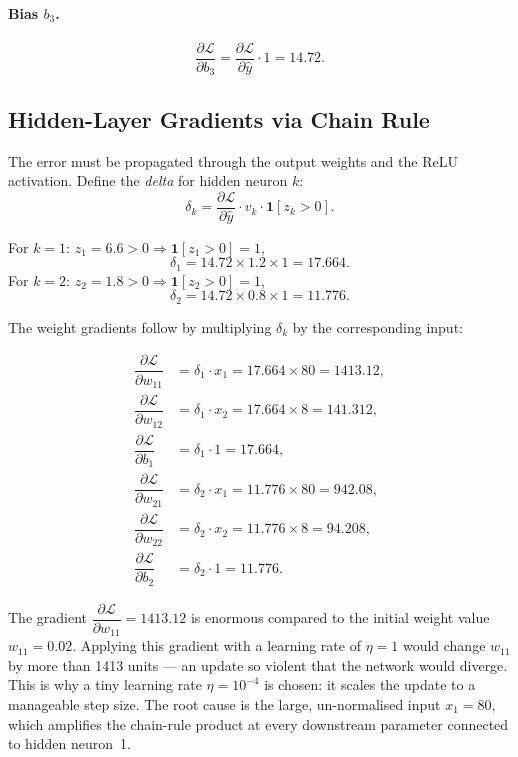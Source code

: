 \documentclass[12pt,a4paper]{article}
\newcommand{\Loss}{\mathcal{L}}
\newcommand{\yhat}{\hat{y}}
\newcommand{\pderiv}[2]{\dfrac{\partial #1}{\partial #2}}
\begin{document}
\paragraph{Bias $b_3$.}
\begin{equation}
  \pderiv{\Loss}{b_3}
    = \pderiv{\Loss}{\yhat}\cdot 1
    = \mathbf{14.72}.
  \label{eq:grad-b3}
\end{equation}

\subsection{Hidden-Layer Gradients via Chain Rule}

The error must be propagated through the output weights and the ReLU
activation.  Define the \emph{delta} for hidden neuron $k$:
\begin{equation}
  \delta_k = \pderiv{\Loss}{\yhat}\cdot v_k \cdot \mathbf{1}[z_k > 0].
  \label{eq:delta-k}
\end{equation}

For $k=1$: $z_1 = 6.6 > 0 \Rightarrow \mathbf{1}[z_1>0]=1$,
\[
  \delta_1 = 14.72 \times 1.2 \times 1 = 17.664.
\]
For $k=2$: $z_2 = 1.8 > 0 \Rightarrow \mathbf{1}[z_2>0]=1$,
\[
  \delta_2 = 14.72 \times 0.8 \times 1 = 11.776.
\]

The weight gradients follow by multiplying $\delta_k$ by the
corresponding input:

\begin{align}
  \pderiv{\Loss}{w_{11}} &= \delta_1 \cdot x_1 = 17.664 \times 80 = \mathbf{1413.12}, \label{eq:grad-w11}\\
  \pderiv{\Loss}{w_{12}} &= \delta_1 \cdot x_2 = 17.664 \times 8  = \mathbf{141.312},  \label{eq:grad-w12}\\
  \pderiv{\Loss}{b_1}    &= \delta_1 \cdot 1   = \mathbf{17.664},                       \label{eq:grad-b1}\\[4pt]
  \pderiv{\Loss}{w_{21}} &= \delta_2 \cdot x_1 = 11.776 \times 80 = \mathbf{942.08},   \label{eq:grad-w21}\\
  \pderiv{\Loss}{w_{22}} &= \delta_2 \cdot x_2 = 11.776 \times 8  = \mathbf{94.208},   \label{eq:grad-w22}\\
  \pderiv{\Loss}{b_2}    &= \delta_2 \cdot 1   = \mathbf{11.776}.                       \label{eq:grad-b2}
\end{align}

\begin{warningbox}
The gradient $\pderiv{\Loss}{w_{11}} = 1413.12$ is enormous compared to the
initial weight value $w_{11}=0.02$.  Applying this gradient with a learning
rate of $\eta = 1$ would change $w_{11}$ by more than 1413 units --- an
update so violent that the network would diverge.
This is why a tiny learning rate $\eta = 10^{-4}$ is chosen: it scales the
update to a manageable step size.
The root cause is the large, un-normalised input $x_1 = 80$, which amplifies
the chain-rule product at every downstream parameter connected to hidden
neuron~1.
\end{warningbox}
\end{document}
